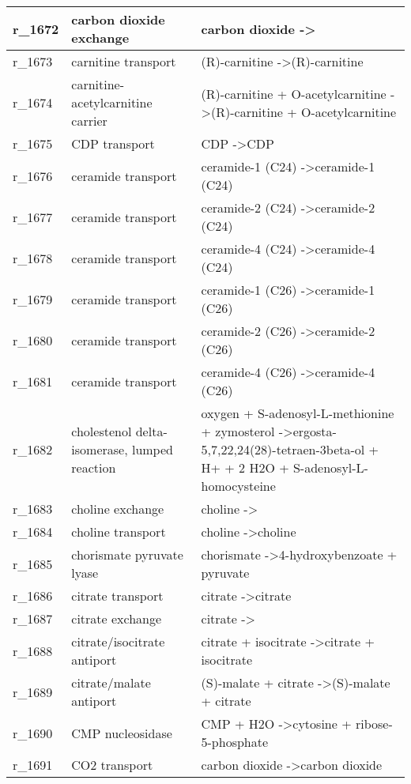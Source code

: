 \begin{landscape}
{\begin{longtable}{|l|p{7cm}|p{15cm}|}
r\_1672 & carbon dioxide exchange & carbon dioxide  -\textgreater{} \\ \hline
r\_1673 & carnitine transport & (R)-carnitine  -\textgreater (R)-carnitine \\ \hline
r\_1674 & carnitine-acetylcarnitine carrier & (R)-carnitine + O-acetylcarnitine  -\textgreater (R)-carnitine + O-acetylcarnitine \\ \hline
r\_1675 & CDP transport & CDP  -\textgreater CDP \\ \hline
r\_1676 & ceramide transport & ceramide-1 (C24)  -\textgreater ceramide-1 (C24) \\ \hline
r\_1677 & ceramide transport & ceramide-2 (C24)  -\textgreater ceramide-2 (C24) \\ \hline
r\_1678 & ceramide transport & ceramide-4 (C24)  -\textgreater ceramide-4 (C24) \\ \hline
r\_1679 & ceramide transport & ceramide-1 (C26)  -\textgreater ceramide-1 (C26) \\ \hline
r\_1680 & ceramide transport & ceramide-2 (C26)  -\textgreater ceramide-2 (C26) \\ \hline
r\_1681 & ceramide transport & ceramide-4 (C26)  -\textgreater ceramide-4 (C26) \\ \hline
r\_1682 & cholestenol delta-isomerase, lumped reaction & oxygen + S-adenosyl-L-methionine + zymosterol  -\textgreater ergosta-5,7,22,24(28)-tetraen-3beta-ol + H+ + 2 H2O + S-adenosyl-L-homocysteine \\ \hline
r\_1683 & choline exchange & choline  -\textgreater{} \\ \hline
r\_1684 & choline transport & choline  -\textgreater choline \\ \hline
r\_1685 & chorismate pyruvate lyase & chorismate  -\textgreater 4-hydroxybenzoate + pyruvate \\ \hline
r\_1686 & citrate transport & citrate  -\textgreater citrate \\ \hline
r\_1687 & citrate exchange & citrate  -\textgreater{} \\ \hline
r\_1688 & citrate/isocitrate antiport & citrate + isocitrate  -\textgreater citrate + isocitrate \\ \hline
r\_1689 & citrate/malate antiport & (S)-malate + citrate  -\textgreater (S)-malate + citrate \\ \hline
r\_1690 & CMP nucleosidase & CMP + H2O  -\textgreater cytosine + ribose-5-phosphate \\ \hline
r\_1691 & CO2 transport & carbon dioxide  -\textgreater carbon dioxide \\ \hline

\end{longtable}}
\end{landscape}
